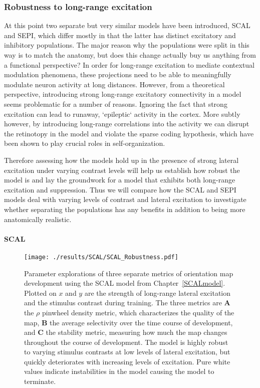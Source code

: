 \subsubsection*{Robustness to long-range excitation}

At this point two separate but very similar models have been
introduced, SCAL and SEPI, which differ mostly in that the latter has
distinct excitatory and inhibitory populations. The major reason why
the populations were split in this way is to match the anatomy, but
does this change actually buy us anything from a functional
perspective? In order for long-range excitation to mediate contextual
modulation phenomena, these projections need to be able to
meaningfully modulate neuron activity at long distances. However, from
a theoretical perspective, introducing strong long-range excitatory
connectivity in a model seems problematic for a number of
reasons. Ignoring the fact that strong excitation can lead to runaway,
`epileptic` activity in the cortex. More subtly however, by
introducing long-range correlations into the activity we can disrupt
the retinotopy in the model and violate the sparse coding hypothesis,
which have been shown to play crucial roles in self-organization.

Therefore assessing how the models hold up in the presence of strong
lateral excitation under varying contrast levels will help us
establish how robust the model is and lay the groundwork for a model
that exhibits both long-range excitation and suppression. Thus we will
compare how the SCAL and SEPI models deal with varying levels of
contrast and lateral excitation to investigate whether separating the
populations has any benefits in addition to being more anatomically
realistic.

\paragraph{SCAL}

\begin{figure}
	\centering
        \texttt{[image: ./results/SCAL/SCAL\_Robustness.pdf]}
	\caption{Parameter explorations of three separate metrics of
      orientation map development using the SCAL model from
      Chapter~\ref{SCALmodel}. Plotted on $x$ and $y$ are the strength
      of long-range lateral excitation and the stimulus contrast
      during training. The three metrics are \textbf{A} the $\rho$
      pinwheel density metric, which characterizes the quality of the
      map, \textbf{B} the average selectivity over the time course of
      development, and \textbf{C} the stability metric, measuring how
      much the map changes throughout the course of development. The
      model is highly robust to varying stimulus contrasts at low
      levels of lateral excitation, but quickly deteriorates with
      increasing levels of excitation. Pure white values indicate
      instabilities in the model causing the model to terminate.}
	\label{SCALStability}
\end{figure}

